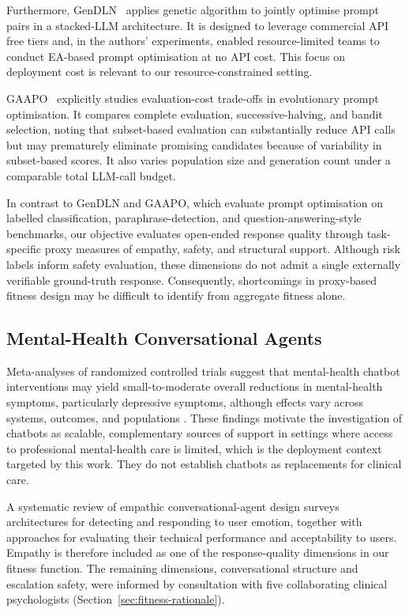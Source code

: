 \documentclass[mathematics,article,submit,xetex,moreauthors]{Definitions/mdpi}
\begin{document}
Furthermore, GenDLN~\cite{gendl2025} applies genetic algorithm to jointly optimise
prompt pairs in a stacked-LLM architecture. It is designed to
leverage commercial API free tiers and, in the authors' experiments, enabled resource-limited teams to conduct
EA-based prompt optimisation at no API cost. This focus on deployment cost is
relevant to our resource-constrained setting.

GAAPO~\cite{gaapo2025} explicitly studies evaluation-cost trade-offs in
evolutionary prompt optimisation. It compares complete evaluation, successive-halving,
and bandit selection, noting that subset-based evaluation can
substantially reduce API calls but may prematurely eliminate promising
candidates because of variability in subset-based scores. It also varies
population size and generation count under a comparable total LLM-call budget.

In contrast to GenDLN and GAAPO, which evaluate prompt optimisation on
labelled classification, paraphrase-detection, and question-answering-style
benchmarks, our objective evaluates open-ended response quality through
task-specific proxy measures of empathy, safety, and structural support. Although risk labels inform safety evaluation,
these dimensions do not admit a single externally verifiable ground-truth
response. Consequently, shortcomings in proxy-based fitness design may be
difficult to identify from aggregate fitness alone.


\subsection{Mental-Health Conversational Agents}

Meta-analyses of randomized controlled trials suggest that mental-health
chatbot interventions may yield small-to-moderate overall reductions in
mental-health symptoms, particularly depressive symptoms, although effects
vary across systems, outcomes, and populations
\cite{jmir2025_chatbots,pmc2026_chatbots}. These findings motivate the
investigation of chatbots as scalable, complementary sources of support in
settings where access to professional mental-health care is limited, which is
the deployment context targeted by this work. They do not establish chatbots
as replacements for clinical care.

A systematic review of empathic conversational-agent design
\cite{jmir2024_empathic} surveys architectures for detecting and responding
to user emotion, together with approaches for evaluating their technical
performance and acceptability to users. Empathy is therefore included as one
of the response-quality dimensions in our fitness function. The remaining
dimensions, conversational structure and escalation safety, were informed by
consultation with five collaborating clinical psychologists
(Section~\ref{sec:fitness-rationale}).
\end{document}
